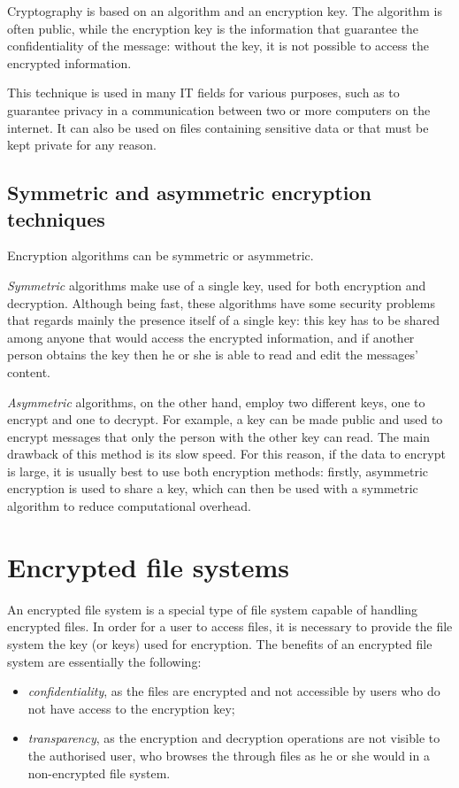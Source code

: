 \documentclass[a4paper,12pt,twoside,openright]{report}
\begin{document}
  Cryptography is based on an algorithm and an encryption key. The algorithm is often public, while
  the encryption key is the information that guarantee the confidentiality of the message:
  without the key, it is not possible to access the encrypted information.

  This technique is used in many IT fields for various purposes, such as to guarantee privacy in a communication
  between two or more computers on the internet.
  It can also be used on files containing sensitive data or that must be kept private for any reason.

  \subsection{Symmetric and asymmetric encryption techniques}

  Encryption algorithms can be symmetric or asymmetric.

  \textit{Symmetric} algorithms make use of a single key, used for both encryption and decryption.
  Although being fast, these algorithms have some security problems that regards mainly the presence itself
  of a single key: this key has to be shared among anyone that would access the encrypted information,
  and if another person obtains the key then he or she is able to read and edit the messages' content.

  \textit{Asymmetric} algorithms, on the other hand, employ two different keys, one to encrypt and one to decrypt.
  For example, a key can be made public and used to encrypt messages that only the person with the other key can read.
  The main drawback of this method is its slow speed. For this reason, if the data to encrypt is large,
  it is usually best to use both encryption methods: firstly, asymmetric encryption is used to share a key,
  which can then be used with a symmetric algorithm to reduce computational overhead.

  \section{Encrypted file systems}

  An encrypted file system is a special type of file system capable of handling encrypted files.
  In order for a user to access files, it is necessary to provide the file system the key (or keys)
  used for encryption.
  The benefits of an encrypted file system are essentially the following:
  \begin{itemize}
    \item \textit{confidentiality}, as the files are encrypted and not accessible by users who do not have access to the encryption key;
    \item \textit{transparency}, as the encryption and decryption operations are not visible to the authorised user, who browses the through files as he or she would in a non-encrypted file system.
  \end{itemize}
\end{document}
